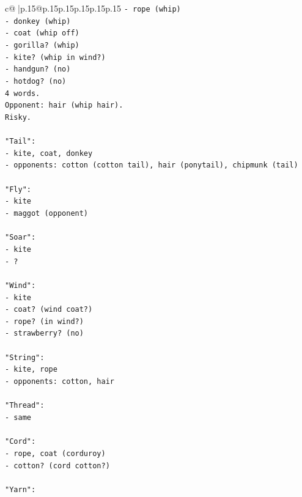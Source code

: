 \documentclass{article}
\begin{document}
{\begin{supertabular}{c@{$\;$}|p{.15\linewidth}@{}p{.15\linewidth}p{.15\linewidth}p{.15\linewidth}p{.15\linewidth}p{.15\linewidth}}
{{{\texttt{{-} rope (whip)} \\
\texttt{{-} donkey (whip)} \\
\texttt{{-} coat (whip off)} \\
\texttt{{-} gorilla? (whip)} \\
\texttt{{-} kite? (whip in wind?)} \\
\texttt{{-} handgun? (no)} \\
\texttt{{-} hotdog? (no)} \\
\texttt{4 words.} \\
\texttt{Opponent: hair (whip hair).} \\
\texttt{Risky.} \\
\\ 
\texttt{"Tail":} \\
\texttt{{-} kite, coat, donkey} \\
\texttt{{-} opponents: cotton (cotton tail), hair (ponytail), chipmunk (tail)} \\
\\ 
\texttt{"Fly":} \\
\texttt{{-} kite} \\
\texttt{{-} maggot (opponent)} \\
\\ 
\texttt{"Soar":} \\
\texttt{{-} kite} \\
\texttt{{-} ?} \\
\\ 
\texttt{"Wind":} \\
\texttt{{-} kite} \\
\texttt{{-} coat? (wind coat?)} \\
\texttt{{-} rope? (in wind?)} \\
\texttt{{-} strawberry? (no)} \\
\\ 
\texttt{"String":} \\
\texttt{{-} kite, rope} \\
\texttt{{-} opponents: cotton, hair} \\
\\ 
\texttt{"Thread":} \\
\texttt{{-} same} \\
\\ 
\texttt{"Cord":} \\
\texttt{{-} rope, coat (corduroy)} \\
\texttt{{-} cotton? (cord cotton?)} \\
\\ 
\texttt{"Yarn":} \\
}}}
\end{supertabular}}
\end{document}

